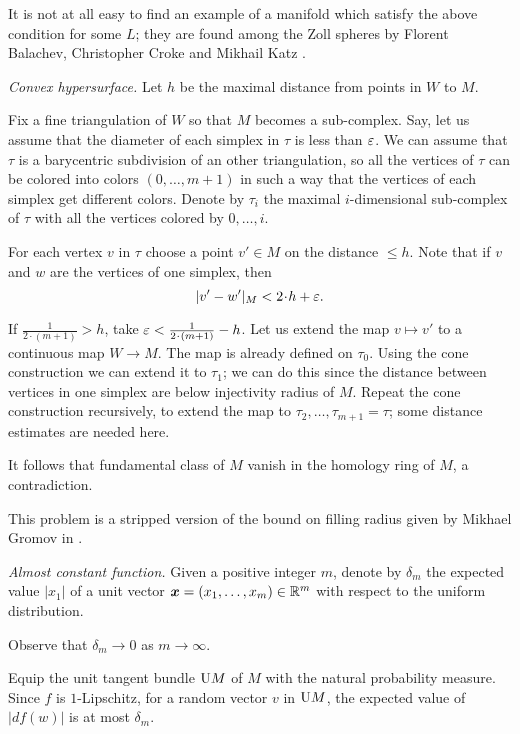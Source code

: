 It is not at all easy to find an example of a manifold  which satisfy the above condition for some $L$;
they are found among the Zoll spheres
by Florent Balachev, Christopher Croke and Mikhail Katz \cite[see][]{balacheff-croke-katz}.

\textit{Convex hypersurface.}
Let $h$ be the maximal distance from points in $W$ to $M$.

Fix a fine triangulation of $W$ 
so that $M$ becomes a sub-complex.
Say, let us assume that the diameter of each simplex in $\tau$ is less than 
$\varepsilon$.
We can assume that $\tau$ is a barycentric subdivision of an other triangulation, so all the vertices of $\tau$ can be colored into colors $(0,\dots, m+1)$
in such a way that the vertices of each simplex 
get different colors.
Denote by $\tau_i$ the maximal $i$-dimensional sub-complex of $\tau$ 
with all the vertices colored by $0,\dots, i$.

For each vertex $v$ in $\tau$ 
choose a point $v'\in M$ on the distance $\le h$.
Note that 
if $v$ and $w$ are the vertices of one simplex,
then
\[|v'-w'|_M<2\cdot h+\eps.\]

If $\tfrac{1}{2\cdot(m+1)}>h$, take $\eps<\tfrac{1}{2\cdot(m+1)}-h$.
Let us extend the map $v\mapsto v'$ 
to a continuous 
map $W\to M$.
The map is already defined on $\tau_0$.
Using the cone construction we can extend it to $\tau_1$;
we can do this since the distance between vertices in one simplex are below injectivity radius of $M$.
Repeat the cone construction recursively, to extend the map to $\tau_2,\dots,\tau_{m+1}=\tau$;
some distance estimates are needed here.

It follows that fundamental class of $M$ vanish in the homology ring of $M$, 
a contradiction.  

This problem is a stripped version of the bound on filling radius given by Mikhael Gromov in \cite{gromov-filling}.  

\textit{Almost constant function.}
Given a positive integer $m$,
denote by $\delta_m$ 
the expected value $|x_1|$ of a unit vector 
$\bm{x}=(x_1,\dots,x_m)\z\in\RR^m$ 
with respect to the uniform distribution.

Observe that $\delta_m\to 0$ as $m\to\infty$.

Equip the unit tangent bundle $\mathrm{U} M$ of $M$ with the natural probability measure.
Since $f$ is $1$-Lipschitz,
for a random vector $v$ in $\mathrm{U} M$,
the  expected value of $|df(w)|$
is at most $\delta_m$.


